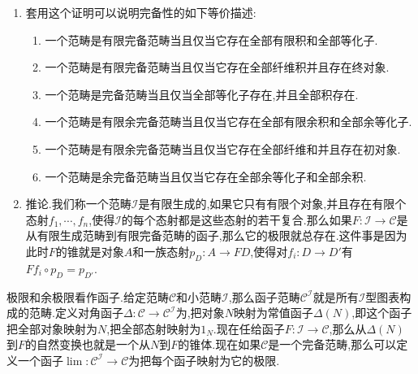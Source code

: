 \begin{enumerate}
\begin{proof}
    	再考虑等化子.对任意的态射$f,g:A\to B$,它们的等化子定义为如下纤维积:
    	$$\xymatrix{E\ar[d]_e\ar[r]^h&B\ar[d]^{\Delta=(1_B,1_B)}\\
    		A\ar[r]_{(f,g)}&B\times B}$$
    \end{proof}
	\item 套用这个证明可以说明完备性的如下等价描述:
	\begin{enumerate}
		\item 一个范畴是有限完备范畴当且仅当它存在全部有限积和全部等化子.
		\item 一个范畴是有限完备范畴当且仅当它存在全部纤维积并且存在终对象.
		\item 一个范畴是完备范畴当且仅当全部等化子存在,并且全部积存在.
		\item 一个范畴是有限余完备范畴当且仅当它存在全部有限余积和全部余等化子.
		\item 一个范畴是有限余完备范畴当且仅当它存在全部纤维和并且存在初对象.
		\item 一个范畴是余完备范畴当且仅当它存在全部余等化子和全部余积.
	\end{enumerate}
    \item 推论.我们称一个范畴$\mathscr{I}$是有限生成的,如果它只有有限个对象,并且存在有限个态射$f_1,\cdots,f_n$,使得$\mathscr{I}$的每个态射都是这些态射的若干复合.那么如果$F:\mathscr{I}\to\mathscr{C}$是从有限生成范畴到有限完备范畴的函子,那么它的极限就总存在.这件事是因为此时$F$的锥就是对象$A$和一族态射$p_D:A\to FD$,使得对$f_i:D\to D'$有$Ff_i\circ p_D=p_{D'}$.
\end{enumerate}

极限和余极限看作函子.给定范畴$\mathscr{C}$和小范畴$\mathscr{I}$,那么函子范畴$\mathscr{C}^{\mathscr{I}}$就是所有$\mathscr{I}$型图表构成的范畴.定义对角函子$\Delta:\mathscr{C}\to\mathscr{C}^{\mathscr{I}}$为,把对象$N$映射为常值函子$\Delta(N)$,即这个函子把全部对象映射为$N$,把全部态射映射为$1_N$.现在任给函子$F:\mathscr{I}\to\mathscr{C}$,那么从$\Delta(N)$到$F$的自然变换也就是一个从$N$到$F$的锥体.现在如果$\mathscr{C}$是一个完备范畴,那么可以定义一个函子$\lim:\mathscr{C}^{\mathscr{I}}\to\mathscr{C}$为把每个函子映射为它的极限.

